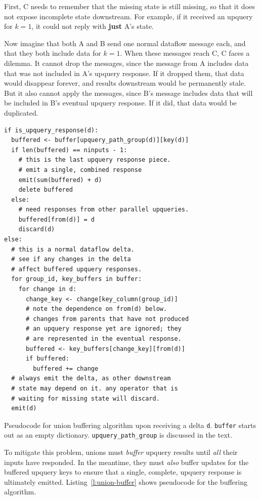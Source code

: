 First, C needs to remember that the missing state is still missing, so that it
does not expose incomplete state downstream. For example, if it received an
upquery for $k = 1$, it could not reply with \textbf{just} A's state.

Now imagine that both A and B send one normal dataflow message each, and that
they both include data for $k = 1$. When these messages reach C, C faces a
dilemma. It cannot drop the messages, since the message from A includes data
that was not included in A's upquery response. If it dropped them, that data
would disappear forever, and results downstream would be permanently stale. But
it also cannot apply the messages, since B's message includes data that will be
included in B's eventual upquery response. If it did, that data would be
duplicated.

\begin{listing}
  \begin{verbatim}
if is_upquery_response(d):
  buffered <- buffer[upquery_path_group(d)][key(d)]
  if len(buffered) == ninputs - 1:
    # this is the last upquery response piece.
    # emit a single, combined response
    emit(sum(buffered) + d)
    delete buffered
  else:
    # need responses from other parallel upqueries.
    buffered[from(d)] = d
    discard(d)
else:
  # this is a normal dataflow delta.
  # see if any changes in the delta
  # affect buffered upquery responses.
  for group_id, key_buffers in buffer:
    for change in d:
      change_key <- change[key_column(group_id)]
      # note the dependence on from(d) below.
      # changes from parents that have not produced
      # an upquery response yet are ignored; they
      # are represented in the eventual response.
      buffered <- key_buffers[change_key][from(d)]
      if buffered:
        buffered += change
  # always emit the delta, as other downstream
  # state may depend on it. any operator that is
  # waiting for missing state will discard.
  emit(d)
  \end{verbatim}
  \caption{Pseudocode for union buffering algorithm upon receiving a delta
  \texttt{d}. \texttt{buffer} starts out as an empty dictionary.
  \texttt{upquery\_path\_group} is discussed in the text.}
  \label{l:union-buffer}
\end{listing}

To mitigate this problem, unions must \textit{buffer} upquery results until
\emph{all} their inputs have responded. In the meantime, they must \emph{also}
buffer updates for the buffered upquery keys to ensure that a single, complete,
upquery response is ultimately emitted. Listing~\vref{l:union-buffer} shows
pseudocode for the buffering algorithm.

